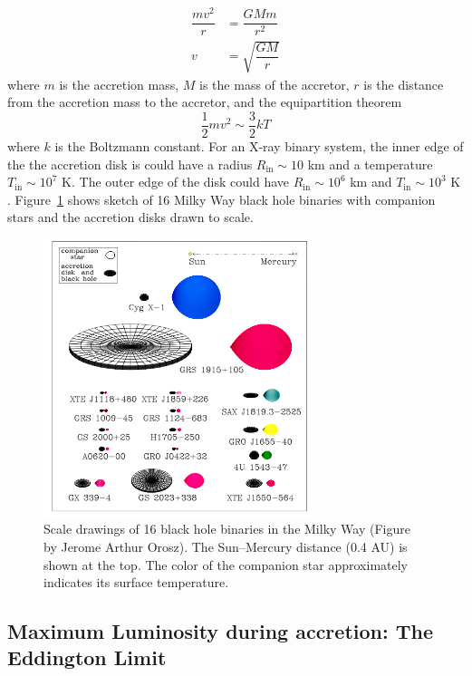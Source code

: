 \begin{align}
     \dfrac{mv^2}{r} &= \dfrac{GMm}{r^2}\\
     v &= \sqrt{\dfrac{GM}{r}}
\end{align}
where $m$ is the accretion mass, $M$ is the mass of the accretor, $r$ is the distance from the accretion mass to the accretor,
and the equipartition theorem
\begin{equation}
    \dfrac{1}{2}mv^2 \sim \dfrac{3}{2}kT
\end{equation}
where $k$ is the Boltzmann constant.
For an X-ray binary system, the inner edge of the the accretion disk is could have a radius $R_{\mathrm{in}} \sim 10$ km and a temperature $T_{\mathrm{in}} \sim 10^7$ K. The outer edge of the disk could have $R_{\mathrm{in}} \sim 10^6 $ km and $T_{\mathrm{in}} \sim 10^3$ K \citep{King2002}. 
Figure~\ref{bhbinary} shows sketch of 16 Milky Way black hole binaries with companion stars and the accretion disks drawn to scale.\par


\begin{figure}[ht]
    \centering
    \includegraphics[width = 0.7\textwidth]{Chapters/Figures/BH_binaries.png}
    \caption{Scale drawings of 16 black hole binaries in the Milky Way (Figure by Jerome Arthur Orosz). The Sun–Mercury distance (0.4 AU) is shown at the top. The color of the companion star approximately indicates its surface temperature.}
    \label{bhbinary}
\end{figure}

\subsection{Maximum Luminosity during accretion: The Eddington Limit}

